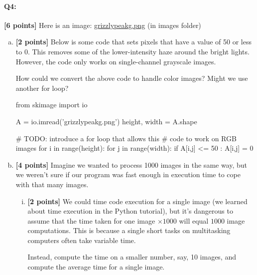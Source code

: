 \documentclass[11pt]{article}
\begin{document}
\paragraph{Q4:} \textbf{[6 points]} Here is an image: \href{run:images/grizzlypeakg.png}{grizzlypeakg.png} (in images folder)

\begin{enumerate}[(a)]
    \item 
\textbf{[2 points]}
Below is some code that sets pixels that have a value of 50 or less to 0. This removes some of the lower-intensity haze around the bright lights. However, the code only works on single-channel grayscale images.

\begin{tcolorbox}[colback=orange!5!white,colframe=orange!75!black]
How could we convert the above code to handle color images? Might we use another for loop?
\end{tcolorbox}

\begin{tcolorbox}[enhanced jigsaw,pad at break*=1mm,colback=white!5!white,colframe=green!75!black,height=10cm]
\begin{python}
from skimage import io

A = io.imread('grizzlypeakg.png')
height, width = A.shape

# TODO: introduce a for loop that allows this 
# code to work on RGB images
for i in range(height):
    for j in range(width):
        if A[i,j] <= 50 :
            A[i,j] = 0
\end{python}
\end{tcolorbox}

\item \textbf{[4 points]} Imagine we wanted to process 1000 images in the same way, but we weren't sure if our program was fast enough in execution time to cope with that many images. 

\begin{enumerate}[(i)]
    \item \textbf{[2 points]} We could time code execution for a single image (we learned about time execution in the Python tutorial), but it's dangerous to assume that the time taken for one image $\times1000$ will equal $1000$ image computations. This is because a single short tasks on multitasking computers often take variable time. 

\begin{tcolorbox}[colback=orange!5!white,colframe=orange!75!black]
Instead, compute the time on a smaller number, say, 10 images, and compute the average time for a single image.
\end{tcolorbox}


\end{enumerate}
\end{enumerate}
\end{document}
